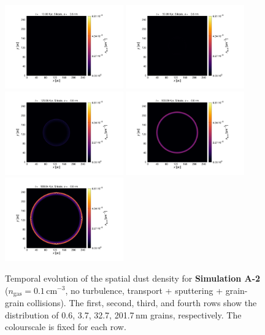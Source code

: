 \documentclass[fleqn,usenatbib]{mnras}
\begin{document}
\begin{figure}
  \includegraphics[trim=2.8cm 1.5cm 9.3cm 2.0cm, clip=true,page=4,height = 3.6cm]{Pics/Pics_A2/Density_1_00041.pdf}\hspace*{-0.05cm}
 \includegraphics[trim=5.2cm 1.5cm 9.3cm 2.0cm, clip=true,page=4,height = 3.6cm]{Pics/Pics_A2/Density_1_00201.pdf}\hspace*{-0.05cm}
 \includegraphics[trim=5.2cm 1.5cm 9.3cm 2.0cm, clip=true,page=4,height = 3.6cm]{Pics/Pics_A2/Density_1_00501.pdf}\hspace*{-0.05cm}
 \includegraphics[trim=5.2cm 1.5cm 9.3cm 2.0cm, clip=true,page=4,height = 3.6cm]{Pics/Pics_A2/Density_1_02001.pdf}\hspace*{-0.05cm}
 \includegraphics[trim=5.2cm 1.5cm 3.2cm 2.0cm, clip=true,page=4,height = 3.6cm]{Pics/Pics_A2/Density_1_04000.pdf}\\
  \caption{Temporal evolution of the spatial dust density for \textbf{Simulation A-2} ($n_\text{gas}=0.1\,\text{cm}^{-3}$, no turbulence, transport + sputtering + grain-grain collisions). The first, second, third, and fourth rows show the distribution of 0.6, 3.7, 32.7, 201.7$\,$nm grains, respectively. The colourscale is fixed for each row.}
   \label{fig_A2} 
  \end{figure}  
 
\end{document}
